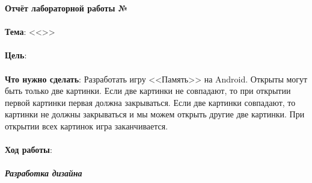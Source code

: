 \documentclass[12pt, a4paper, simple]{eskdtext}
\def \gpiDocTopic {Отчёт лабораторной работы №\gpiDocNum}
\begin{document}
    
    \begin{center}
        \textbf{\gpiDocTopic}
    \end{center}

    \paragraph{} \textbf{Тема}: <<\gpiTopic>>

    \paragraph{} \textbf{Цель}: 

    \paragraph{} \textbf{Что нужно сделать}:
    Разработать игру <<Память>> на Android. Открыты могут быть только две картинки.
    Если две картинки не совпадают, то при открытии первой картинки первая должна закрываться.
    Если две картинки совпадают, то картинки не должны закрываться и мы можем открыть другие две картинки.
    При открытии всех картинок игра заканчивается.

    \paragraph{} \textbf{Ход работы}:

    \subparagraph{Разработка дизайна} \hspace{0pt}
\end{document}
